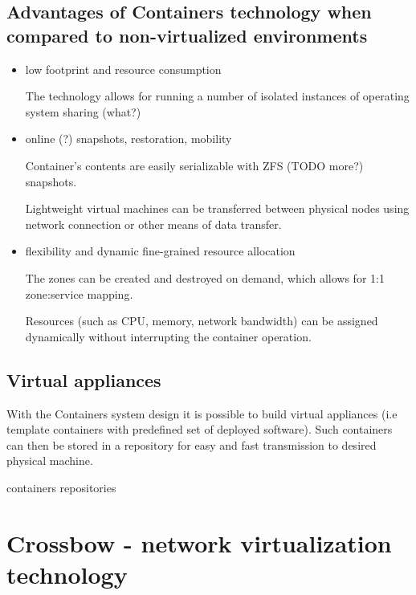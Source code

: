 \documentclass[11pt]{book}
\begin{document}
      \subsection{Advantages of Containers technology when compared to non-virtualized environments}
      \label{sub:}
              
        \begin{itemize}
          \item low footprint and resource consumption


            The technology allows for running a number of isolated instances of operating system sharing (what?)

          \item online (?) snapshots, restoration, mobility

            Container's contents are easily serializable with ZFS (TODO more?) snapshots.

            Lightweight virtual machines can be transferred between physical nodes using network connection or other
            means of data transfer.

          \item flexibility and dynamic fine-grained resource allocation

            The zones can be created and destroyed on demand, which allows for 1:1 zone:service mapping.

            Resources (such as CPU, memory, network bandwidth) can be assigned dynamically without interrupting the
            container operation.

        \end{itemize}


      \subsection{Virtual appliances}
      \label{sub:}

        With the Containers system design it is possible to build virtual appliances (i.e template containers with
        predefined set of deployed software). Such containers can then be stored in a repository for easy and fast
        transmission to desired physical machine.

        containers repositories
      

    \section{Crossbow - network virtualization technology}
\end{document}
